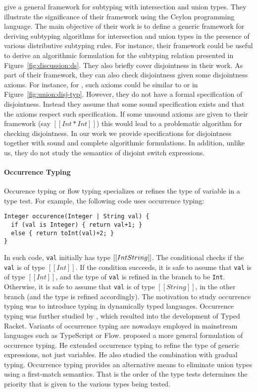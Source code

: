\citet{muehlboeck2018empowering} give a general framework for subtyping
with intersection and union types. They illustrate the significance of
their framework using the Ceylon programming language.
The main objective of their work is to define a generic framework for
deriving subtyping algorithms for
intersection and union types in the presence of various distributive subtyping rules.
For instance, their framework could be useful to derive an algorithmic
formulation for the subtyping relation presented in Figure~\ref{fig:discussion:ds}.
They also briefly cover disjointness in their work. As part of their framework, they
can also check disjointness given some disjointness axioms. For instance,
for \name, such axioms could be similar to  or 
in Figure~\ref{fig:union:disj-typ}.
However, they do not have a formal
specification of disjointness. Instead they assume that some sound specification
exists and that the axioms respect such specification.
If some unsound axioms are given to their framework (say $[[Int * Int]]$) this
would lead to a problematic algorithm for checking disjointness.
In our work we provide specifications for disjointness together
with sound and complete algorithmic formulations.
In addition, unlike us,
they do not study the semantics of disjoint switch expressions.

\paragraph{Occurrence Typing}
Occurence typing or flow typing \cite{tobin2008design} specializes or refines
the type of variable in a type test. For example, the following code
uses occurrence typing:

\begin{lstlisting}
Integer occurence(Integer | String val) {
  if (val is Integer) { return val+1; }
  else { return toInt(val)+2; }
}
\end{lstlisting}

\noindent In such code, \lstinline{val} initially has type $[[Int \/ String]]$.
The conditional checks if the \lstinline{val} is of type $[[Int]]$.
If the condition succeeds, it is safe to assume that \lstinline{val} is of type $[[Int]]$,
and the type of \lstinline{val} is refined in the branch to be \lstinline{Int}.
Otherwise, it is safe to assume that \lstinline{val} is of type $[[String]]$, in the
other branch (and the type is refined accordingly).
The motivation to study occurrence typing was to introduce typing in dynamically
typed languages.
Occurrence typing was further studied by \cite{tobin2010logical},
which resulted into the development of Typed Racket.
Variants of occurrence typing are nowadays employed in mainstream languages
such as TypeScript or Flow.
\cite{castagna2019revisiting} proposed a more general formulation of
occurence typing. He extended occurrence typing to refine the type of
generic expressions, not just variables. He also studied the combination
with gradual typing. Occurrence typing provides an alternative
means to eliminate union types using a first-match semantics. That is the
order of the type tests determines the priority that is given to the various
types being tested.

